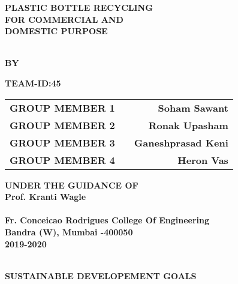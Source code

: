 \documentclass{article}
\begin{document}
\begin{center}
    


\thispagestyle{empty}

\LARGE{\textsc {\textbf{PLASTIC BOTTLE RECYCLING}}}\\[0.1cm]
\LARGE{\textsc {\textbf{FOR COMMERCIAL AND}}}\\[0.1cm]
\LARGE{\textsc {\textbf{DOMESTIC PURPOSE}}}\\[0.5cm]


\vspace{0.5cm}

\Large{\textbf{\\BY}}\\[0.3cm]
\begin{table}[h]
\centering
\Large{\bfseries TEAM-ID:45}\\[0.3cm]
\Large{
\begin{tabular}{l c r}
{\bfseries GROUP MEMBER 1}& & {\bfseries Soham Sawant}\\{\bfseries GROUP MEMBER 2} & & {\bfseries Ronak Upasham}\\{\bfseries GROUP MEMBER 3} & &{\bfseries Ganeshprasad Keni}\\{\bfseries GROUP MEMBER 4} & &{\bfseries Heron Vas}\\
\end{tabular}}
\end{table}
\vspace{0.5cm}
\Large{\textbf{UNDER THE GUIDANCE OF}}\\
\Large{\textbf{Prof. Kranti Wagle}}\\
\vspace{1cm}
\large{\textbf{}}\\
\Large{\textbf{Fr. Conceicao Rodrigues College Of Engineering}}\\
\Large{\textbf{Bandra (W), Mumbai -400050 }}
\Large{\textbf{\\2019-2020}}\\
\vspace{1cm}
\Large{\textbf{\\}}
\LARGE{\textbf{}}
\newpage
\end{center}

\newpage

\begin{center}
    

    
    
    \LARGE{\textsc {\textbf{SUSTAINABLE DEVELOPEMENT GOALS}}}\\[0.5cm]
    
\end{center}
\end{document}
